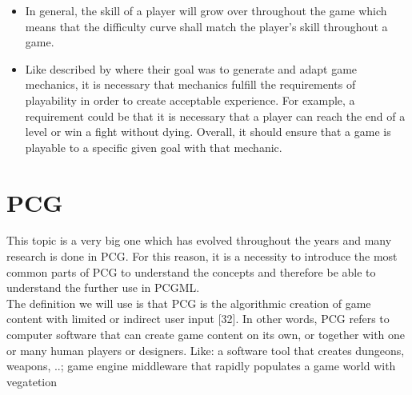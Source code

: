 \documentclass[MGS,Master,english]{twbook}%
\begin{document}
\begin{itemize}
	\item In general, the skill of a player will grow over throughout the game which means that the difficulty curve shall match the player's skill throughout a game. \cite{mechanic::gamasutra::DanielDoan}
	\item Like described by \cite{mechanic::generateAndAdaptingMechanics} where their goal was to generate and adapt game mechanics, it is necessary that mechanics fulfill the requirements of playability in order to create acceptable experience. For example, a requirement could be that it is necessary that a player can reach the end of a level or win a fight without dying. Overall, it should ensure that a game is playable to a specific given goal with that mechanic.
\end{itemize} 


%
%
\clearpage
\chapter{\acl{PCG}}
This topic is a very big one which has evolved throughout the years and many research is done in \ac{PCG}. For this reason, it is a necessity to introduce the most common parts of PCG to understand the concepts and therefore be able to understand the further use in \ac{PCGML}.\\
The definition we will use is that PCG is the algorithmic creation of game content with limited or indirect user input [32]. In other words, PCG refers to computer software that can create game content on its own, or together with one or many human players or designers. \cite{pcg::whatIsPCG}
Like: a software tool that creates dungeons, weapons, ..; game engine middleware that rapidly populates a game world with vegatetion
\end{document}
